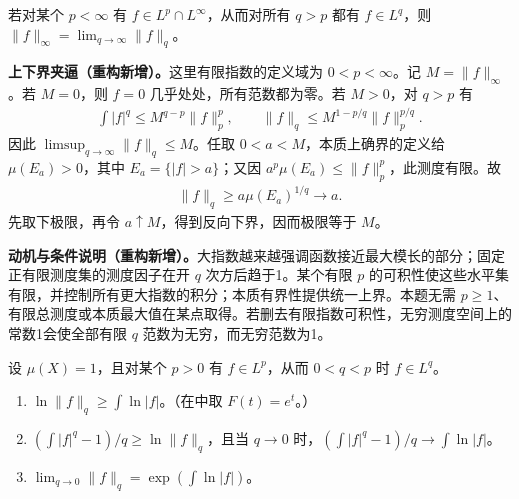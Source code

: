 \documentclass[../../main.tex]{subfiles}
\begin{document}
\begin{exercise}\label{exercise:ch06-large-exponent-limit}
若对某个 $p<\infty$ 有 $f\in L^p\cap L^\infty$，从而对所有 $q>p$ 都有 $f\in L^q$，则 $\|f\|_\infty=\lim_{q\to\infty}\|f\|_q$。
\end{exercise}
\begin{solution}
\textbf{上下界夹逼（重构新增）。}这里有限指数的定义域为 $0<p<\infty$。记 $M=\|f\|_\infty$。若 $M=0$，则 $f=0$ 几乎处处，所有范数都为零。若 $M>0$，对 $q>p$ 有
\begin{align*}
\int|f|^q\leqslant M^{q-p}\|f\|_p^p,
\qquad \|f\|_q\leqslant M^{1-p/q}\|f\|_p^{p/q}.
\end{align*}
因此 $\limsup_{q\to\infty}\|f\|_q\leqslant M$。任取 $0<a<M$，本质上确界的定义给 $\mu(E_a)>0$，其中 $E_a=\{|f|>a\}$；又因 $a^p\mu(E_a)\leqslant\|f\|_p^p$，此测度有限。故
\begin{align*}
\|f\|_q\geqslant a\mu(E_a)^{1/q}\longrightarrow a.
\end{align*}
先取下极限，再令 $a\uparrow M$，得到反向下界，因而极限等于 $M$。
\end{solution}
\begin{remark}
\textbf{动机与条件说明（重构新增）。}大指数越来越强调函数接近最大模长的部分；固定正有限测度集的测度因子在开 $q$ 次方后趋于1。某个有限 $p$ 的可积性使这些水平集有限，并控制所有更大指数的积分；本质有界性提供统一上界。本题无需 $p\geqslant1$、有限总测度或本质最大值在某点取得。若删去有限指数可积性，无穷测度空间上的常数1会使全部有限 $q$ 范数为无穷，而无穷范数为1。
\end{remark}
\begin{exercise}\label{exercise:ch06-zero-exponent-limit}
设 $\mu(X)=1$，且对某个 $p>0$ 有 $f\in L^p$，从而 $0<q<p$ 时 $f\in L^q$。
\begin{enumerate}
\item\label{item:ch06-zero-exponent-jensen} $\ln\|f\|_q\geqslant\int\ln|f|$。（在中取 $F(t)=e^t$。）
\item\label{item:ch06-zero-exponent-difference} $(\int|f|^q-1)/q\geqslant\ln\|f\|_q$，且当 $q\to0$ 时，$(\int|f|^q-1)/q\to\int\ln|f|$。
\item\label{item:ch06-zero-exponent-geometric} $\lim_{q\to0}\|f\|_q=\exp(\int\ln|f|)$。
\end{enumerate}
\end{exercise}
\end{document}
